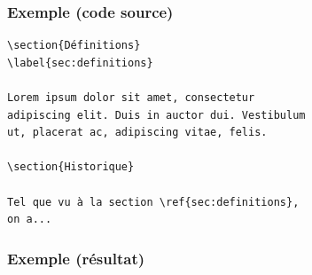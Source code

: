 \begin{frame}[fragile=singleslide]
  \frametitle{Exemple (code source)}

  \begin{lstlisting}[emph={\label,\ref}]
\section{Définitions}
\label{sec:definitions}

Lorem ipsum dolor sit amet, consectetur
adipiscing elit. Duis in auctor dui. Vestibulum
ut, placerat ac, adipiscing vitae, felis.

\section{Historique}

Tel que vu à la section \ref{sec:definitions},
on a...
\end{lstlisting}
\end{frame}

\begin{frame}
  \frametitle{Exemple (résultat)}

\end{frame}

